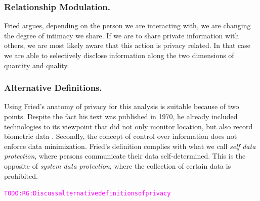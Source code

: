 \documentclass[runningheads,a4paper]{llncs}
\newcommand{\TODO}[1]{\begin{alltt}\textcolor{magenta}{TODO: #1}\end{alltt}}
\begin{document}
\subsubsection{Relationship Modulation.}
Fried argues, depending on the person we are interacting with, we are changing the degree of intimacy we share.
If we are to share private information with others, we are most likely aware that this action is privacy related.
In that case we are able to selectively disclose information along the two dimensions of quantity and quality.
\cite{CFried:Privacy}

\subsubsection{Alternative Definitions.}
Using Fried's anatomy of privacy for this analysis is suitable because of two points.
Despite the fact his text was published in 1970, he already included technologies to its viewpoint that did not only monitor location, but also record biometric data \cite{CFried:Privacy}. 
Secondly, the concept of control over information does not enforce data minimization.
Fried's definition complies with what we call \textit{self data protection}, where persons communicate their data self-determined.
This is the opposite of \textit{system data protection}, where the collection of certain data is prohibited. 

\TODO{RG: Discuss alternative definitions of privacy}

\end{document}
